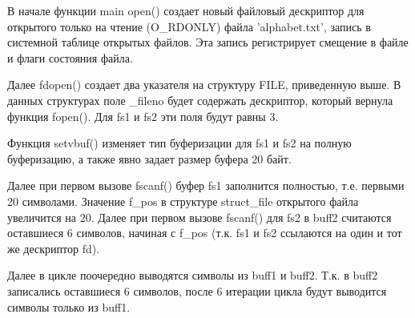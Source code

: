 \documentclass[a4paper,oneside,12pt]{extreport}
\begin{document}
\begin{task}
    В начале функции main open() создает новый файловый дескриптор для открытого
    только на чтение (O\_RDONLY) файла 'alphabet.txt', запись в системной таблице открытых файлов. 
    Эта запись регистрирует смещение в файле и флаги состояния файла.
    
    Далее fdopen() создает два указателя на структуру FILE, приведенную выше.
    В данных структурах поле \_fileno будет содержать дескриптор, который вернула
    функция fopen(). Для fs1 и fs2 эти поля будут равны 3.

    Функция setvbuf() изменяет тип буферизации для fs1 и fs2 на
    полную буферизацию, а также явно задает размер буфера 20 байт.

    Далее при первом вызове fscanf() буфер fs1 заполнится полностью, 
    т.е. первыми 20 символами. 
    Значение f\_pos в структуре struct\_file открытого файла увеличится на 20.
    Далее при первом вызове fscanf() для fs2 в buff2 считаются оставшиеся 6 символов,
    начиная с f\_pos (т.к. fs1 и fs2 ссылаются на один и тот же дескриптор fd).

    Далее в цикле поочередно выводятся символы из buff1 и buff2.
    Т.к. в buff2 записались оставшиеся 6 символов, после 6 итерации
    цикла будут выводится символы только из buff1.

    \begin{figure}[ht!]
    \end{figure}

\end{task}

\newpage
\end{document}
